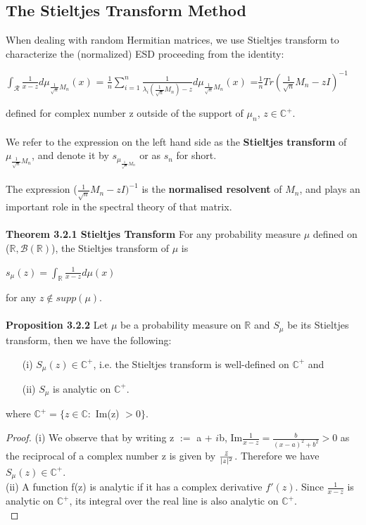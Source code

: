 \documentclass{article}
\begin{document}
 \subsection{The Stieltjes Transform Method}
 When dealing with random Hermitian matrices, we use Stieltjes transform to characterize the (normalized) ESD proceeding from the identity:
 \begin{center}
     $\int_{\mathcal{R}} \frac{1}{x - z} d\mu_{\frac{1}{\sqrt{n}} M_n}(x)$ = $\frac{1}{n} \sum\limits_{i=1}^n \frac{1}{\lambda_i (\frac{1}{\sqrt{n}} M_n) - z} d\mu_{\frac{1}{\sqrt{n}} M_n}(x)$ =$\frac{1}{n} Tr(\frac{1}{\sqrt{n}} M_n - zI)^{-1}$
 \end{center}
defined for complex number z outside of the support of $\mu_n$, $z \in \mathbb{C}^+$. \\ \\
We refer to the expression on the left hand side as the \textbf{Stieltjes transform} of $\mu_{\frac{1}{\sqrt{n}} M_n}$, and denote it by $s_{\mu_{\frac{1}{\sqrt{n}} M_n}}$ or as $s_n$ for short.\\
\\
The expression ($\frac{1}{\sqrt{n}} M_n - zI)^{-1}$ is the \textbf{normalised resolvent} of $M_n$, and plays an important role in the spectral theory of that matrix. \\
\\
\textbf{Theorem 3.2.1 Stieltjes Transform} For any probability measure $\mu$ defined on ($\mathbb{R}, \mathcal{B}(\mathbb{R})$), the Stieltjes transform of $\mu$ is
\begin{center}
    $s_\mu (z) = \int_{\mathbb{R}} \frac{1}{x - z} d\mu (x)$
\end{center}
for any $z \notin supp(\mu)$. \\
\\
\textbf{Proposition 3.2.2} Let $\mu$ be a probability measure on $\mathbb{R}$ and $S_{\mu}$ be its Stieltjes transform, then we have the following: 
\begin{itemize}
    \item[(i)] $S_\mu (z) \in \mathbb{C}^+$, i.e. the Stieltjes transform is well-defined on $\mathbb{C}^+$ and 
    \item[(ii)] $S_\mu$ is analytic on $\mathbb{C}^{+} $.
\end{itemize}
where $\mathbb{C}^+ = \{ z \in \mathbb{C} :$ Im(z) $ > 0\}$.
\begin{proof}
    (i) We observe that by writing z $:=$ a + $i$b, Im$\frac{1}{x - z} = \frac{b}{(x - a)^2 + b^2} > 0$ as the reciprocal of a complex number z is given by $\frac{\Bar{z}}{\mid z \mid ^2}$. Therefore we have $S_\mu(z) \in \mathbb{C}^+$.\\
    (ii) A function f(z) is analytic if it has a complex derivative $f'(z)$. Since $\frac{1}{x - z}$ is analytic on $\mathbb{C}^+$, its integral over the real line is also analytic on $\mathbb{C}^+$. \\
\end{proof}
\end{document}
